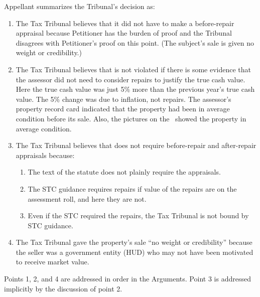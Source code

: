 \documentclass[12pt,\documentclassflag]{michiganCourtOfAppealsBrief}
\begin{document}
Appellant summarizes the Tribunal's decision as:

\begin{enumerate}
  
\item The Tax Tribunal believes that it did not have to make a before-repair appraisal because Petitioner has the burden of proof and the Tribunal disagrees with Petitioner's proof on this point. (The subject's sale is given no weight or credibility.)
  
\item The Tax Tribunal believes that \mathieuGast is not violated if there is some evidence that the assessor did not need to consider repairs to justify the true cash value. Here the true cash value was just 5\% more than the previous year's true cash value. The 5\% change was due to inflation, not repairs. The assessor's property record card indicated that the property had been in average condition before its sale. Also, the pictures on the \MLS\ showed the property in average condition.
  
\item The Tax Tribunal believes that \mathieuGast does not require before-repair and after-repair appraisals because:
  \begin{enumerate}
  \item The text of the statute does not plainly require the appraisals.
  \item The STC guidance requires repairs if value of the repairs are on the assessment roll, and here they are not.
  \item Even if the STC required the repairs, the Tax Tribunal is not bound by STC guidance.
  \end{enumerate}

\item The Tax Tribunal gave the property's sale ``no weight or credibility'' because the seller was a government entity (HUD) who may not have been motivated to receive market value.
  
\end{enumerate}

Points 1, 2, and 4 are addressed in order in the Arguments. Point 3 is addressed implicitly by the discussion of point 2.  


	
\end{document}
